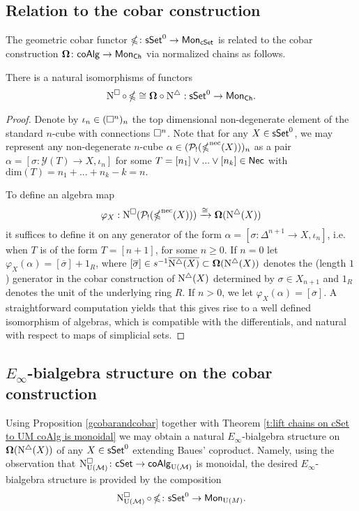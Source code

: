 \subsection{Relation to the cobar construction}

The geometric cobar functor $\operatorname{\mathbb{\Omega}}\colon \mathsf{sSet}^0 \to \mathsf{Mon}_{\mathsf{cSet}}$ is related to the cobar construction $\mathbf{\Omega}\colon \mathsf{coAlg} \to \mathsf{Mon}_{\mathsf{Ch}}$ via normalized chains as follows.

\begin{proposition} \label{gcobarandcobar}
There is a natural isomorphisms of functors 
$$\operatorname{N^{\square}} \circ \operatorname{\mathbb{\Omega}} \cong \mathbf{\Omega} \circ \operatorname{N^{\triangle}}: \mathsf{sSet}^0 \to \mathsf{Mon}_{\mathsf{Ch}}.$$
\end{proposition}

\begin{proof} 
Denote by $\iota_n \in (\square^n)_n$ the top dimensional non-degenerate element of the standard $n$-cube with connections $\square^n$. Note that for any $X \in \mathsf{sSet}^0$, we may represent any non-degenerate $n$-cube $\alpha \in (\mathcal{P}_!(\operatorname{\mathbb{\Omega}}^{\text{nec}}(X)))_n$ as a pair $\alpha=[\sigma: \mathcal{Y}(T) \to X, \iota_n]$ for some $T=[n_1] \vee ... \vee [n_k] \in \mathsf{Nec}$ with $\text{dim}(T)=n_1+ ...+n_k-k=n.$

To define an algebra map
$$\varphi_X: \operatorname{N^{\square}}(\mathcal{P}_!(\operatorname{\mathbb{\Omega}}^{\text{nec}}(X))) \xrightarrow{\cong} \mathbf{\Omega}(\operatorname{N^{\triangle}}(X))$$
it suffices to define it on any generator of the form $\alpha=[\sigma \colon \Delta^{n+1} \to X, \iota_{n}]$, i.e. when $T$ is of the form $T=[n+1]$, for some $n\geq0$. If $n=0$ let $\varphi_X(\alpha)= [\overline{\sigma}]+ 1_R$, where $[\overline{\sigma}] \in s^{-1} \overline{ \operatorname{N^{\triangle}}(X)} \subset \mathbf{\Omega}(\operatorname{N^{\triangle}}(X))$ denotes the (length $1$) generator in the cobar construction of $\operatorname{N^{\triangle}}(X)$ determined by $\sigma \in X_{n+1}$ and $1_R$ denotes the unit of the underlying ring $R$. If $n>0$, we let $\varphi_X(\alpha)=[\overline{\sigma}]$. A straightforward computation yields that this gives rise to a well defined isomorphism of algebras, which is compatible with the differentials, and natural with respect to maps of simplicial sets.  
\end{proof}

\subsection{$E_{\infty}$-bialgebra structure on the cobar construction}\label{UMoncobar}

Using Proposition \ref{gcobarandcobar} together with Theorem \ref{t:lift chains on cSet to UM coAlg is monoidal} we may obtain a natural $E_{\infty}$-bialgebra structure on $\operatorname{\mathbf{\Omega}}(\operatorname{N^{\triangle}}(X))$ of any $X \in \mathsf{sSet}^0$ extending Baues' coproduct. Namely, using the observation that $\operatorname{N^{\square}_{{\mathrm{U}(\mathcal{M})}}} \colon \mathsf{cSet} \to \mathsf{coAlg}_{{\mathrm{U}(\mathcal{M})}}$ is monoidal, the desired $E_{\infty}$-bialgebra structure is provided by the composition 
$$\operatorname{N^{\square}_{{\mathrm{U}(\mathcal{M})}}} \circ \operatorname{\mathbb{\Omega}} \colon \mathsf{sSet}^0 \to \mathsf{Mon}_{\operatorname{U}(M)}.$$

